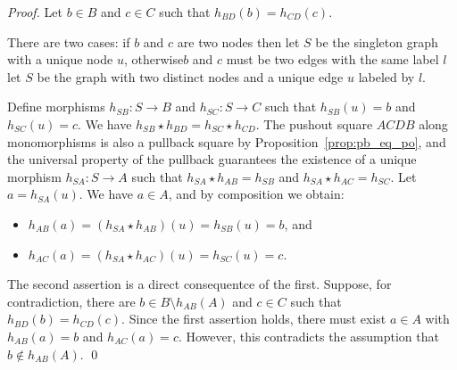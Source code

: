 \begin{proof}
     Let \( b \mathop{\in} B \) and \( c \mathop{\in} C \) such that \( h_{BD}(b) \mathop{=} h_{CD}(c) \). 
     
     There are two cases: if $b$ and $c$ are two nodes then let \( S \) be the singleton graph with a unique node \( u \), otherwise\textemdash$b$ and $c$ must be two edges with the same label $l$\textemdash let \( S \) be the graph with two distinct nodes and a unique edge \( u \) labeled by $l$.
     
     Define morphisms \( h_{SB}: S \mathop{\to} B \) and \( h_{SC}: S \mathop{\to} C \) such that \( h_{SB}(u) \mathop{=} b \) and \( h_{SC}(u) \mathop{=} c \). We have \( h_{SB} \mathop{\star} h_{BD} \mathop{=} h_{SC} \mathop{\star} h_{CD} \). The pushout square \( ACDB \) along monomorphisms is also a pullback square by Proposition~\ref{prop:pb_eq_po}, and the universal property of the pullback guarantees the existence of a unique morphism \( h_{SA}: S \mathop{\to} A \) such that \( h_{SA} \mathop{\star} h_{AB} \mathop{=} h_{SB} \) and \( h_{SA} \mathop{\star} h_{AC} \mathop{=} h_{SC} \). Let \( a \mathop{=} h_{SA}(u) \). We have \( a \mathop{\in} A \), and by composition we obtain: 
     \begin{itemize}
        \item \(h_{AB}(a) \mathop{=} (h_{SA} \mathop{\star} h_{AB})(u) \mathop{=} h_{SB}(u) \mathop{=} b \), and
        \item \(h_{AC}(a) \mathop{=} (h_{SA} \mathop{\star} h_{AC})(u) \mathop{=} h_{SC}(u) \mathop{=} c\).
     \end{itemize} 

    The second assertion is a direct consequentce of the first. Suppose, for contradiction, there are \( b \mathop{\in} B \mathop{\setminus} h_{AB}(A) \) and \( c \mathop{\in} C \) such that \( h_{BD}(b) \mathop{=} h_{CD}(c) \). Since the first assertion holds, there must exist \( a \mathop{\in} A \) with \( h_{AB}(a) \mathop{=} b \) and \( h_{AC}(a) \mathop{=} c \). However, this contradicts the assumption that \( b \notin h_{AB}(A) \).
    \qed
\end{proof}

